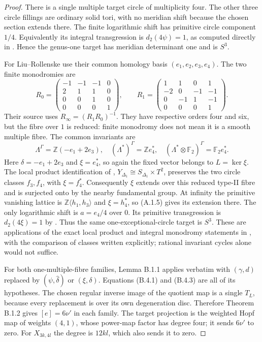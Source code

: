 \begin{proof}
There is a single multiple target circle of
multiplicity four.  The other three circle
fillings are ordinary solid tori, with no
meridian shift because the chosen section
extends there.  The finite logarithmic
shift has primitive circle component $1/4$.
Equivalently its integral transgression is
$d_2(4\psi)=1$, as computed directly in
\cite[Proposition 5.4]{mapsVia2}.
Hence the genus-one target has meridian
determinant one and is $S^3$.

For Liu--Rollenske use their common homology
basis $(e_1,e_2,e_3,e_4)$.  The two finite
monodromies are
\[
 R_0=\begin{pmatrix}-1&-1&-1&0\\2&1&1&0\\0&0&1&0\\0&0&0&1\end{pmatrix},
 \qquad
 R_1=\begin{pmatrix}1&1&0&1\\-2&0&-1&-1\\0&-1&1&-1\\0&0&0&1\end{pmatrix}.
\]
Their source uses $R_\infty=(R_1R_0)^{-1}$.
They have respective orders four and six,
but the fibre over $1$ is reduced: finite
monodromy does not mean it is a smooth
multiple fibre.  The common invariants are
\[
 \Lambda^\Gamma=\mathbb Z(-e_1+2e_3),
 \quad(\Lambda^*)^\Gamma=\mathbb Z e_4^*,
 \quad(\Lambda^*\otimes\mathbb F_2)^\Gamma
            =\mathbb F_2 e_4^*.
 \tag{B.4.3}
\]
Here $\delta=-e_1+2e_3$ and $\xi=e_4^*$,
so again the fixed vector belongs to
$L=\ker\xi$.
The local product identification of
\cite[Lemma 3.10 and Proposition 3.11]{mapsLR},
$Y_{\Delta_1}\cong S_{\Delta_1}\times T^2$,
preserves the two circle classes $f_3,f_4$,
with $\xi=f_4^*$.  Consequently $\xi$
extends over this reduced type-II fibre
and is surjected onto by the nearby
fundamental group.  At infinity the
primitive vanishing lattice is
$\mathbb Z\langle h_1,h_3\rangle$ and
$\xi=h_4^*$, so (A.1.5) gives its
extension there.  The only logarithmic
shift is $a=e_4/4$ over $0$.
Its primitive transgression is
$d_2(4\xi)=1$ by \cite[Proposition 4.8]{mapsLR}.
Thus the same one-exceptional-circle
target is $S^3$.  These are applications
of the exact local product and integral
monodromy statements in
\cite[Propositions 3.12--3.13 and Corollary 3.16]{mapsLR},
with the comparison of classes written
explicitly; rational invariant cycles
alone would not suffice.

For both one-multiple-fibre families,
Lemma B.1.1 applies verbatim with
$(\gamma,d)$ replaced by $(\psi,\widehat\delta)$
or $(\xi,\delta)$.  Equations (B.4.1)
and (B.4.3) are all of its hypotheses.
The chosen regular inverse image of
the quotient map is a single $T_L$,
because every replacement is over its
own degeneration disc.  Therefore
Theorem B.1.2 gives $[e]=6\nu'$ in
each family.  The target projection
is the weighted Hopf map of weights
$(4,1)$, whose power-map factor has
degree four; it sends $6\nu'$ to zero.
For $X_{3k,4l}$ the degree is $12kl$,
which also sends it to zero.


\end{proof}

